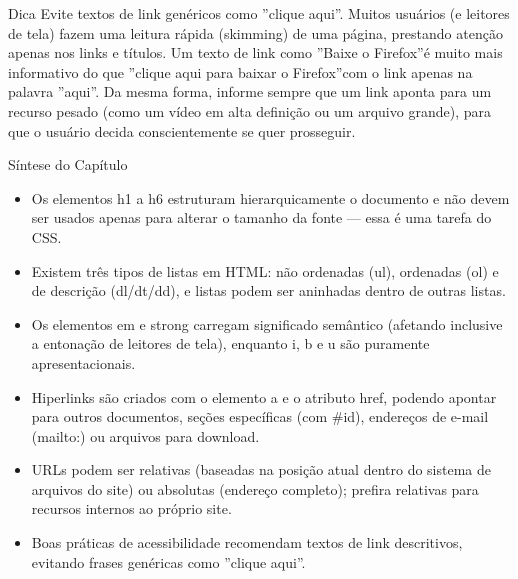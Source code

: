 \begin{infobox}{Dica}
Evite textos de link genéricos como ”clique aqui”. Muitos usuários (e leitores de tela) fazem uma leitura rápida (skimming) de uma página, prestando atenção apenas nos links e títulos. Um texto de link como ”Baixe o Firefox”é muito mais informativo do que ”clique aqui para baixar o Firefox”com o link apenas na palavra ”aqui”. Da mesma forma, informe sempre que um link aponta para um recurso pesado (como um vídeo em alta definição ou um arquivo grande), para que o usuário decida conscientemente se quer prosseguir.
\end{infobox}

Síntese do Capítulo

\begin{itemize}
  \item Os elementos h1 a h6 estruturam hierarquicamente o documento e não devem ser usados apenas para alterar o tamanho da fonte — essa é uma tarefa do CSS.
\end{itemize}

\begin{itemize}
  \item Existem três tipos de listas em HTML: não ordenadas (ul), ordenadas (ol) e de descrição (dl/dt/dd), e listas podem ser aninhadas dentro de outras listas.
\end{itemize}

\begin{itemize}
  \item Os elementos em e strong carregam significado semântico (afetando inclusive a entonação de leitores de tela), enquanto i, b e u são puramente apresentacionais.
\end{itemize}

\begin{itemize}
  \item Hiperlinks são criados com o elemento a e o atributo href, podendo apontar para outros documentos, seções específicas (com \#id), endereços de e-mail (mailto:) ou arquivos para download.
\end{itemize}

\begin{itemize}
  \item URLs podem ser relativas (baseadas na posição atual dentro do sistema de arquivos do site) ou absolutas (endereço completo); prefira relativas para recursos internos ao próprio site.
\end{itemize}

\begin{itemize}
  \item Boas práticas de acessibilidade recomendam textos de link descritivos, evitando frases genéricas como ”clique aqui”.
\end{itemize}
